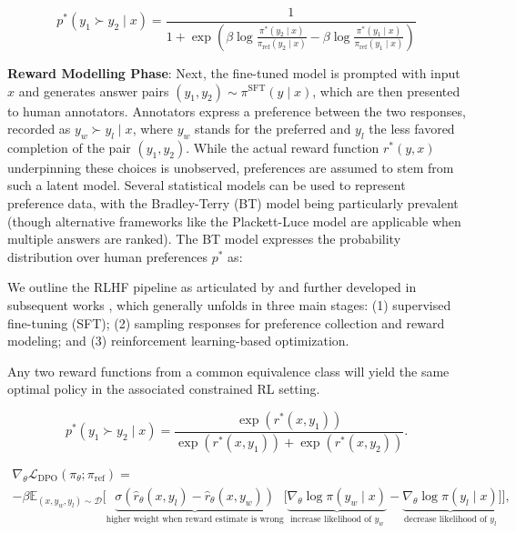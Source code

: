 \begin{equation}\label{eq:objective}
    p^*(y_1\succ y_2 \mid x)=\frac{1}{1 + \exp\left(\beta \log \frac{\pi^*(y_2\mid x)}{\pi_\text{ref}(y_2\mid x)} - \beta \log \frac{\pi^*(y_1\mid x)}{\pi_\text{ref}(y_1\mid x)}\right)}
\end{equation}

\textbf{Reward Modelling Phase}: Next, the fine-tuned model is prompted with input $x$ and generates answer pairs $(y_1, y_2)\sim \pi^\text{SFT}(y \mid x)$, which are then presented to human annotators. Annotators express a preference between the two responses, recorded as $y_w\succ y_l \mid x$, where $y_w$ stands for the preferred and $y_l$ the less favored completion of the pair $(y_1, y_2)$. While the actual reward function $r^*(y, x)$ underpinning these choices is unobserved, preferences are assumed to stem from such a latent model. Several statistical models can be used to represent preference data, with the Bradley-Terry (BT) model \cite{bradley1952rankanalysis} being particularly prevalent (though alternative frameworks like the Plackett-Luce model \citep{plackett1975analysis, luce2012individual} are applicable when multiple answers are ranked). The BT model expresses the probability distribution over human preferences $p^*$ as:

We outline the RLHF pipeline as articulated by \citeauthor{ziegler2020finetuning} and further developed in subsequent works \citep{stiennon2022learning, bai2022training, ouyang2022training}, which generally unfolds in three main stages: (1) supervised fine-tuning (SFT); (2) sampling responses for preference collection and reward modeling; and (3) reinforcement learning-based optimization.

\begin{lemma}\label{lemma:same_policy}
    Any two reward functions from a common equivalence class will yield the same optimal policy in the associated constrained RL setting.
\end{lemma}

\begin{equation}\label{eq:bradley-terry}
    p^*(y_1\succ y_2 \mid x)=\frac{\exp\left(r^*(x, y_1)\right)}{\exp\left(r^*(x, y_1)\right) + \exp\left(r^*(x, y_2)\right)}.
\end{equation}

\begin{multline*}\label{eq:gradient}
    \nabla_\theta \mathcal{L}_\text{DPO}(\pi_\theta;\pi_\text{ref}) = \\ -\beta\mathbb{E}_{(x, y_w, y_l) \sim \mathcal{D}} \bigg[\underbrace{\sigma(\hat{r}_\theta(x, y_l) - \hat{r}_\theta (x, y_w))}_\text{higher weight when reward estimate is wrong}\bigg[\underbrace{\nabla_\theta\log \pi(y_w \mid x)}_\text{increase likelihood of $y_w$} - \underbrace{\nabla_\theta\log\pi(y_l \mid x)}_\text{decrease likelihood of $y_l$}\bigg]\bigg],
\end{multline*}

